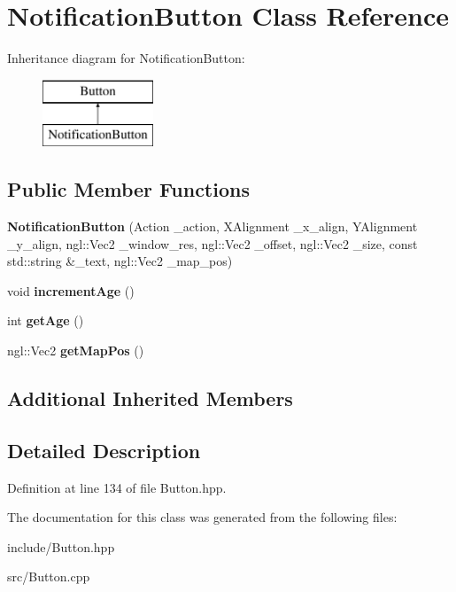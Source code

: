 \hypertarget{class_notification_button}{}\section{Notification\+Button Class Reference}
\label{class_notification_button}
Inheritance diagram for Notification\+Button\+:\begin{figure}[H]
\begin{center}
\leavevmode
\includegraphics[height=2.000000cm]{class_notification_button}
\end{center}
\end{figure}
\subsection*{Public Member Functions}
\begin{DoxyCompactItemize}
\item 
\hypertarget{class_notification_button_a616f018ced46e67a7c30788a08291029}{}{\bfseries Notification\+Button} (Action \+\_\+action, X\+Alignment \+\_\+x\+\_\+align, Y\+Alignment \+\_\+y\+\_\+align, ngl\+::\+Vec2 \+\_\+window\+\_\+res, ngl\+::\+Vec2 \+\_\+offset, ngl\+::\+Vec2 \+\_\+size, const std\+::string \&\+\_\+text, ngl\+::\+Vec2 \+\_\+map\+\_\+pos)\label{class_notification_button_a616f018ced46e67a7c30788a08291029}

\item 
\hypertarget{class_notification_button_a31ff2ec9142e9f3b0bbbeeddddf344a8}{}void {\bfseries increment\+Age} ()\label{class_notification_button_a31ff2ec9142e9f3b0bbbeeddddf344a8}

\item 
\hypertarget{class_notification_button_a8c9ea5a54e467a5b91c1a3c2a46646b7}{}int {\bfseries get\+Age} ()\label{class_notification_button_a8c9ea5a54e467a5b91c1a3c2a46646b7}

\item 
\hypertarget{class_notification_button_acb018ab57225d5638f279a28b5209c52}{}ngl\+::\+Vec2 {\bfseries get\+Map\+Pos} ()\label{class_notification_button_acb018ab57225d5638f279a28b5209c52}

\end{DoxyCompactItemize}
\subsection*{Additional Inherited Members}


\subsection{Detailed Description}


Definition at line 134 of file Button.\+hpp.



The documentation for this class was generated from the following files\+:\begin{DoxyCompactItemize}
\item 
include/Button.\+hpp\item 
src/Button.\+cpp\end{DoxyCompactItemize}
